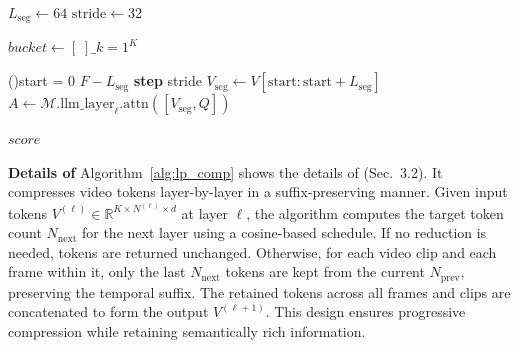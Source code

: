 \begin{algorithm}[b!]
\small
\renewcommand{\thealgocf}{C}
\DontPrintSemicolon
{}
\caption{\textsc{SegmentedLocalAttention}: compute clip‑level saliency scores}
\label{alg:sla}


$L_{\text{seg}}\leftarrow64$ 
$\mathrm{stride}\leftarrow32$          

$\mathit{bucket}\leftarrow[\;]\_{k=1}^{K}$\;

\For(){start = 0 \KwTo $F - L_{\text{seg}}$ \textbf{step} stride}{
  $V_{\text{seg}}\leftarrow V[\text{start}:\text{start}+L_{\text{seg}}]$\;
  $A\leftarrow\mathcal{M}.\mathrm{llm\_layer}_{\ell}.\mathrm{attn}([V_{\text{seg}},Q])$
}

\Return $\mathit{score}$
\end{algorithm}




\noindent\textbf{Details of \drop}\;\; Algorithm~\ref{alg:lp_comp} shows the details of \drop (Sec.~\textcolor{iccvblue}{3.2}). It compresses video tokens layer-by-layer in a suffix-preserving manner. Given input tokens $V^{(\ell)} \in \mathbb{R}^{K \times N^{(\ell)} \times d}$ at layer $\ell$, the algorithm computes the target token count $N_{\text{next}}$ for the next layer using a cosine-based schedule. If no reduction is needed, tokens are returned unchanged. Otherwise, for each video clip and each frame within it, only the last $N_{\text{next}}$ tokens are kept from the current $N_{\text{prev}}$, preserving the temporal suffix. The retained tokens across all frames and clips are concatenated to form the output $V^{(\ell+1)}$. This design ensures progressive compression while retaining semantically rich information.


